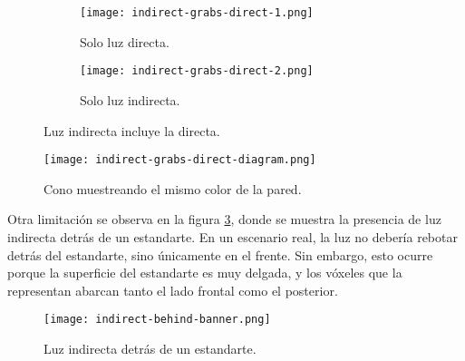 \begin{figure}[h]
    \begin{center}
    \begin{subfigure}{.49\textwidth}
        \texttt{[image: indirect-grabs-direct-1.png]}
        \caption{Solo luz directa.}
    \end{subfigure}
    \begin{subfigure}{.49\textwidth}
        \texttt{[image: indirect-grabs-direct-2.png]}
        \caption{Solo luz indirecta.}
    \end{subfigure}
    \caption{Luz indirecta incluye la directa.}
    \label{fig:indirect-grabs-direct}
    \end{center}
\end{figure}

\begin{figure}[h]
	\begin{center}
	\texttt{[image: indirect-grabs-direct-diagram.png]}
	\caption{Cono muestreando el mismo color de la pared.}
	\label{fig:indirect-grabs-direct-diagram}
	\end{center}
\end{figure}

Otra limitación se observa en la figura \ref{fig:indirect-behind-banner}, donde se muestra la presencia de luz indirecta detrás de un estandarte.
En un escenario real, la luz no debería rebotar detrás del estandarte, sino únicamente en el frente.
Sin embargo, esto ocurre porque la superficie del estandarte es muy delgada, y los vóxeles que la representan abarcan tanto el lado frontal como el posterior.

\begin{figure}
	\centering
	\texttt{[image: indirect-behind-banner.png]}
	\caption{Luz indirecta detrás de un estandarte.}
	\label{fig:indirect-behind-banner}
\end{figure}
